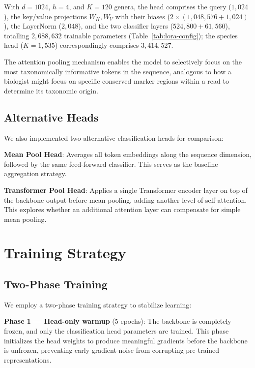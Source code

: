 With $d = 1024$, $h = 4$, and $K = 120$ genera, the head comprises the query ($1{,}024$), the key/value projections $W_K, W_V$ with their biases ($2 \times (1{,}048{,}576 + 1{,}024)$), the LayerNorm ($2{,}048$), and the two classifier layers ($524{,}800 + 61{,}560$), totalling $2{,}688{,}632$ trainable parameters (Table~\ref{tab:lora-config}); the species head ($K = 1{,}535$) correspondingly comprises $3{,}414{,}527$.

The attention pooling mechanism enables the model to selectively focus on the most taxonomically informative tokens in the sequence, analogous to how a biologist might focus on specific conserved marker regions within a read to determine its taxonomic origin.

\subsection{Alternative Heads}
\label{sec:method-alt-heads}

We also implemented two alternative classification heads for comparison:

\textbf{Mean Pool Head}: Averages all token embeddings along the sequence dimension, followed by the same feed-forward classifier. This serves as the baseline aggregation strategy.

\textbf{Transformer Pool Head}: Applies a single Transformer encoder layer on top of the backbone output before mean pooling, adding another level of self-attention. This explores whether an additional attention layer can compensate for simple mean pooling.

\section{Training Strategy}
\label{sec:method-training}

\subsection{Two-Phase Training}

We employ a two-phase training strategy to stabilize learning:

\textbf{Phase 1 --- Head-only warmup} (5 epochs): The backbone is completely frozen, and only the classification head parameters are trained. This phase initializes the head weights to produce meaningful gradients before the backbone is unfrozen, preventing early gradient noise from corrupting pre-trained representations.

